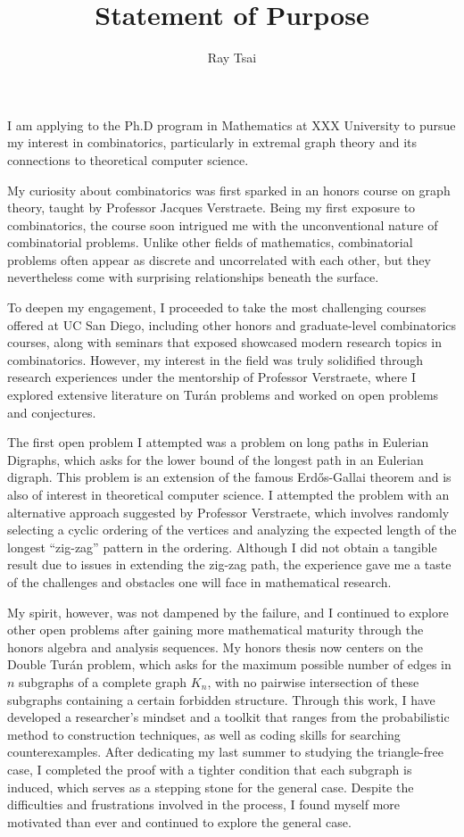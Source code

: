 \documentclass[12pt]{article}
\title{Statement of Purpose}
\author{Ray Tsai}
\date{}
\begin{document}
\maketitle

\vspace{-0.25in}

I am applying to the Ph.D program in Mathematics at XXX University to pursue my interest in
combinatorics, particularly in extremal graph theory and its connections to theoretical computer
science. 

My curiosity about combinatorics was first sparked in an honors course on graph theory, taught by
Professor Jacques Verstraete. Being my first exposure to combinatorics, the course soon intrigued me
with the unconventional nature of combinatorial problems. Unlike other fields of mathematics,
combinatorial problems often appear as discrete and uncorrelated with each other, but they
nevertheless come with surprising relationships beneath the surface.

To deepen my engagement, I proceeded to take the most challenging courses offered at UC San Diego,
including other honors and graduate-level combinatorics courses, along with seminars that exposed
showcased modern research topics in combinatorics. However, my interest in the field was truly
solidified through research experiences under the mentorship of Professor Verstraete, where I
explored extensive literature on Turán problems and worked on open problems and conjectures. 

The first open problem I attempted was a problem on long paths in Eulerian Digraphs, which asks
for the lower bound of the longest path in an Eulerian digraph. This problem is an extension of the
famous Erdős-Gallai theorem and is also of interest in theoretical computer science. I attempted the
problem with an alternative approach suggested by Professor Verstraete, which involves randomly
selecting a cyclic ordering of the vertices and analyzing the expected length of the longest
``zig-zag'' pattern in the ordering. Although I did not obtain a tangible result due to issues in
extending the zig-zag path, the experience gave me a taste of the challenges and obstacles one will
face in mathematical research.

My spirit, however, was not dampened by the failure, and I continued to explore other open problems
after gaining more mathematical maturity through the honors algebra and analysis sequences. My
honors thesis now centers on the Double Turán problem, which asks for the maximum possible number of
edges in $n$ subgraphs of a complete graph $K_n$, with no pairwise intersection of these subgraphs
containing a certain forbidden structure. Through this work, I have developed a researcher's mindset
and a toolkit that ranges from the probabilistic method to construction techniques, as well as
coding skills for searching counterexamples. After dedicating my last summer to studying the
triangle-free case, I completed the proof with a tighter condition that each subgraph is induced,
which serves as a stepping stone for the general case. Despite the difficulties and frustrations
involved in the process, I found myself more motivated than ever and continued to explore the general
case. 
\end{document}
